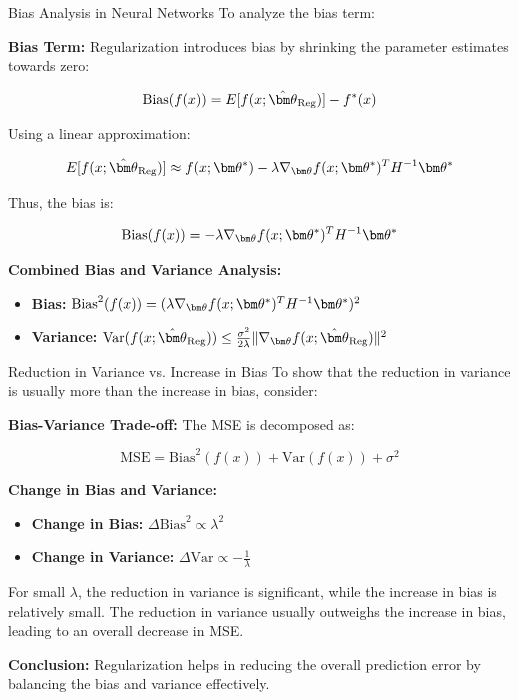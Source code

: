 \documentclass[11pt,compress,t,notes=noshow, xcolor=table]{beamer}
\begin{document}
\begin{vbframe}{Bias Analysis in Neural Networks}
To analyze the bias term:

\textbf{Bias Term:}
Regularization introduces bias by shrinking the parameter estimates towards zero:

\[
\text{Bias}(f(x)) = E[f(x; \hat{\thetav}_{\text{Reg}})] - f^*(x)
\]

Using a linear approximation:

\[
E[f(x; \hat{\thetav}_{\text{Reg}})] \approx f(x; \thetav^*) - \lambda \nabla_{\thetav} f(x; \thetav^*)^T H^{-1} \thetav^*
\]

Thus, the bias is:

\[
\text{Bias}(f(x)) = -\lambda \nabla_{\thetav} f(x; \thetav^*)^T H^{-1} \thetav^*
\]

\textbf{Combined Bias and Variance Analysis:}
\begin{itemize}
    \item \textbf{Bias:} \( \text{Bias}^2(f(x)) = (\lambda \nabla_{\thetav} f(x; \thetav^*)^T H^{-1} \thetav^*)^2 \)
    \item \textbf{Variance:} \( \text{Var}(f(x; \hat{\thetav}_{\text{Reg}})) \leq \frac{\sigma^2}{2\lambda} \|\nabla_{\thetav} f(x; \hat{\thetav}_{\text{Reg}})\|^2 \)
\end{itemize}
\end{vbframe}

\begin{vbframe}{Reduction in Variance vs. Increase in Bias}
To show that the reduction in variance is usually more than the increase in bias, consider:

\textbf{Bias-Variance Trade-off:}
The MSE is decomposed as:

\[
\text{MSE} = \text{Bias}^2(f(x)) + \text{Var}(f(x)) + \sigma^2
\]

\textbf{Change in Bias and Variance:}
\begin{itemize}
    \item \textbf{Change in Bias:} \( \Delta \text{Bias}^2 \propto \lambda^2 \)
    \item \textbf{Change in Variance:} \( \Delta \text{Var} \propto -\frac{1}{\lambda} \)
\end{itemize}

For small \(\lambda\), the reduction in variance is significant, while the increase in bias is relatively small. The reduction in variance usually outweighs the increase in bias, leading to an overall decrease in MSE.

\textbf{Conclusion:}
Regularization helps in reducing the overall prediction error by balancing the bias and variance effectively.
\end{vbframe}
\end{document}
